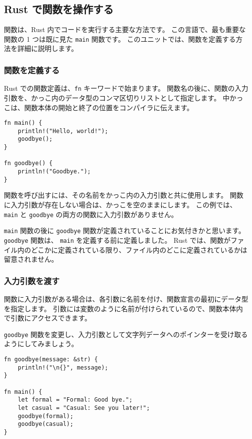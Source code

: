 \subsection{Rust で関数を操作する}

関数は、Rust 内でコードを実行する主要な方法です。 この言語で、最も重要な関数の 1 つは既に見た \texttt{main} 関数です。 このユニットでは、関数を定義する方法を詳細に説明します。

\subsubsection{関数を定義する}

Rust での関数定義は、\texttt{fn} キーワードで始まります。 関数名の後に、関数の入力引数を、かっこ内のデータ型のコンマ区切りリストとして指定します。 中かっこは、関数本体の開始と終了の位置をコンパイラに伝えます。


\begin{lstlisting}[numbers=none]
fn main() {
    println!("Hello, world!");
    goodbye();
}

fn goodbye() {
    println!("Goodbye.");
}
\end{lstlisting}

関数を呼び出すには、その名前をかっこ内の入力引数と共に使用します。 関数に入力引数が存在しない場合は、かっこを空のままにします。 この例では、 \texttt{main} と \texttt{goodbye} の両方の関数に入力引数がありません。

\texttt{main} 関数の後に \texttt{goodbye} 関数が定義されていることにお気付きかと思います。 \texttt{goodbye} 関数は、 \texttt{main} を定義する前に定義しました。 Rust では、関数がファイル内のどこかに定義されている限り、ファイル内のどこに定義されているかは留意されません。

\subsubsection{入力引数を渡す}

関数に入力引数がある場合は、各引数に名前を付け、関数宣言の最初にデータ型を指定します。 引数には変数のように名前が付けられているので、関数本体内で引数にアクセスできます。

\texttt{goodbye} 関数を変更し、入力引数として文字列データへのポインターを受け取るようにしてみましょう。

\begin{lstlisting}[numbers=none]
fn goodbye(message: &str) {
    println!("\n{}", message);
}

fn main() {
    let formal = "Formal: Good bye.";
    let casual = "Casual: See you later!";
    goodbye(formal);
    goodbye(casual);
}
\end{lstlisting}

